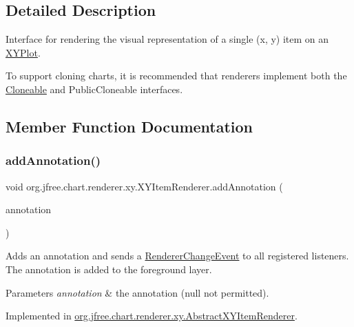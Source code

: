 \subsection{Detailed Description}
Interface for rendering the visual representation of a single (x, y) item on an \mbox{\hyperlink{}{X\+Y\+Plot}}. 

To support cloning charts, it is recommended that renderers implement both the \mbox{\hyperlink{}{Cloneable}} and {\ttfamily Public\+Cloneable} interfaces. 

\subsection{Member Function Documentation}
\mbox{\label{interfaceorg_1_1jfree_1_1chart_1_1renderer_1_1xy_1_1_x_y_item_renderer_a77ae0c811fd22ffd2f808332deadfcbd}} 
\subsubsection{\texorpdfstring{add\+Annotation()}{addAnnotation()}\hspace{0.1cm}{\footnotesize\ttfamily [1/2]}}
{\footnotesize\ttfamily void org.\+jfree.\+chart.\+renderer.\+xy.\+X\+Y\+Item\+Renderer.\+add\+Annotation (\begin{DoxyParamCaption}\item[{\mbox{\hyperlink{interfaceorg_1_1jfree_1_1chart_1_1annotations_1_1_x_y_annotation}{X\+Y\+Annotation}}}]{annotation }\end{DoxyParamCaption})}

Adds an annotation and sends a \mbox{\hyperlink{}{Renderer\+Change\+Event}} to all registered listeners. The annotation is added to the foreground layer.


\begin{DoxyParams}{Parameters}
{\em annotation} & the annotation ({\ttfamily null} not permitted). \\
\hline
\end{DoxyParams}


Implemented in \mbox{\hyperlink{classorg_1_1jfree_1_1chart_1_1renderer_1_1xy_1_1_abstract_x_y_item_renderer_a2ae40a0566352b9cf373449e1392f306}{org.\+jfree.\+chart.\+renderer.\+xy.\+Abstract\+X\+Y\+Item\+Renderer}}.

